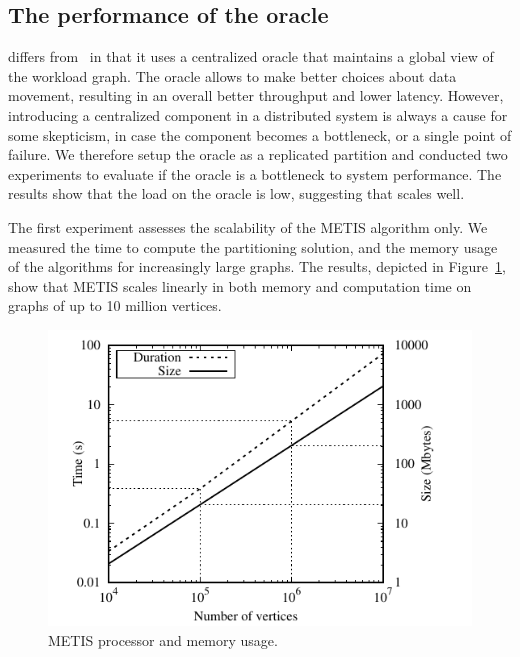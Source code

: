 
\subsection{The performance of the oracle}

\dynastar differs from \dssmr\ in that it uses a centralized oracle
that maintains a global view of the workload graph. The oracle allows
\dynastar to make better choices about data movement, resulting in an overall
better throughput and lower latency. However, introducing a centralized
component in a distributed system is always a cause for some skepticism,
in case the component becomes a bottleneck, or a single point of failure. 
We therefore setup the oracle as a replicated partition 
and conducted two experiments to evaluate if the \dynastar oracle is a bottleneck to
system performance. The results show that the load on the oracle is
low, suggesting that \dynastar scales well.


The first experiment assesses the scalability of the METIS algorithm only.
We measured the time to compute the partitioning solution, and
the memory usage of the algorithms for increasingly large graphs. 
The results, depicted in Figure~\ref{fig:metis_size_time}, show that METIS scales
linearly in both memory and computation time on graphs of up to 10 million vertices.

\begin{figure}[ht!]
  \centering
    \includegraphics[width=\columnwidth]{figures/metis_size_time}
	\caption{METIS processor and memory usage.}
	\label{fig:metis_size_time}
\end{figure}

